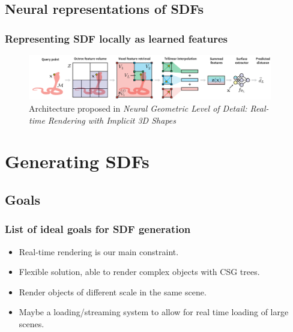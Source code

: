 \documentclass[handout]{beamer}
\begin{document}
\subsection{Neural representations of SDFs}
\begin{frame}
  \frametitle{Representing SDF locally as learned features}
  \begin{figure}
    \centering
    \includegraphics[width=0.95\textwidth]{figures/neural-sdf.png}
    \caption{Architecture proposed in \textit{Neural Geometric Level of Detail: Real-time Rendering with Implicit 3D Shapes}}
    \label{fig:neural-sdf}
  \end{figure}
\end{frame}


\section{Generating SDFs}

\subsection{Goals}

\begin{frame}
  \frametitle{List of ideal goals for SDF generation}
  \begin{itemize}
    \item Real-time rendering is our main constraint.
    \item Flexible solution, able to render complex objects with CSG trees.
    \item Render objects of different scale in the same scene.
    \item Maybe a loading/streaming system to allow for real time loading of large scenes.
  \end{itemize}
\end{frame}
\end{document}
